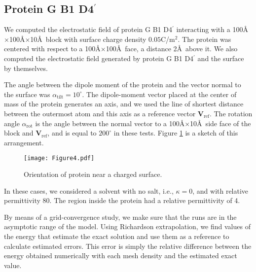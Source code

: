 \subsection{Protein G B1 D4$^{\prime}$} \label{sec:PGB}

We computed the electrostatic field of protein G B1 D4$^{\prime}$ interacting with a 100\AA$\times$100\AA$\times$10\AA\ block with surface charge density $0.05$C/m$^2$. The protein was centered with respect to a  100\AA$\times$100\AA\ face, a distance 2\AA\ above it. We also computed the electrostatic field generated by protein G B1 D4$^\prime$ and the surface by themselves.

The angle between the dipole moment of the protein and the vector normal to the surface was $\alpha_\text{tilt}=10^\circ$. The dipole-moment vector placed at the center of mass of the protein generates an axis, and we used the line of shortest distance between the outermost atom and this axis as a reference vector $\mathbf{V}_{\text{ref}}$. The rotation angle $\alpha_{\text{rot}}$ is the angle between the normal vector to a 100\AA$\times$10\AA\ side face of the block and $\mathbf{V}_{\text{ref}}$, and is equal to $200^\circ$ in these tests. Figure \ref{fig:protein_surface} is a sketch of this arrangement.

\begin{figure}[h] %
   \centering
   \texttt{[image: Figure4.pdf]} 
   \caption{Orientation of protein near a charged surface.}
   \label{fig:protein_surface}
\end{figure}

In these cases, we considered a solvent with no salt, i.e., $\kappa=0$, and with relative permittivity 80. The region inside the protein had a relative permittivity of 4.

By means of a grid-convergence study, we make sure that the runs are in the asymptotic range of the model. Using Richardson extrapolation, we find values of the energy that estimate the exact solution and use them as a reference to calculate estimated errors. This error is simply the relative difference between the energy obtained numerically with each mesh density and the estimated exact value. 

